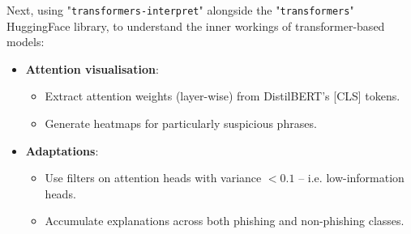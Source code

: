 \noindent Next, using "\texttt{transformers-interpret}" alongside the "\texttt{transformers}" HuggingFace library, to understand the inner workings of transformer-based models:

\begin{itemize}
  \item \textbf{Attention visualisation}:
  \begin{itemize}
    \item Extract attention weights (layer-wise) from DistilBERT's [CLS] tokens.
    \item Generate heatmaps for particularly suspicious phrases.
  \end{itemize}
  \item \textbf{Adaptations}:
  \begin{itemize}
    \item Use filters on attention heads with variance $<0.1$ -- i.e. low-information heads.
    \item Accumulate explanations across both phishing and non-phishing classes.
  \end{itemize}
\end{itemize}
